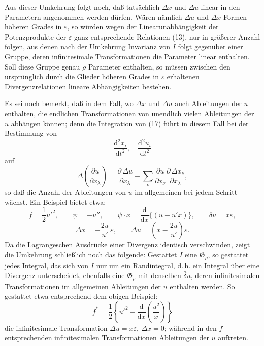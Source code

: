 \documentclass[11pt]{article}
\newcommand{\dd}{\mathrm d}
\newcommand{\G}{\mathfrak G}
\newcommand{\D}{\Delta}
\newcommand{\bd}{\bar{\delta}}
\newcommand{\eps}{\varepsilon}
\newcommand{\p}{\partial}
\begin{document}
Aus dieser Umkehrung folgt noch, daß tatsächlich \(\D x\) und \(\D u\) linear in den Parametern angenommen werden dürfen. Wären nämlich \(\D u\) und \(\D x\) Formen höheren Grades in \(\eps\), so würden wegen der Linearunabhängigkeit der Potenzprodukte der \(\eps\) ganz entsprechende Relationen (13), nur in größerer Anzahl folgen, aus denen nach der Umkehrung Invarianz von \(I\) folgt gegenüber einer Gruppe, deren infinitesimale Transformationen die Parameter linear enthalten. Soll diese Gruppe genau \(\rho\) Parameter enthalten, so müssen zwischen den ursprünglich durch die Glieder höheren Grades in \(\eps\) erhaltenen Divergenzrelationen lineare Abhängigkeiten bestehen.

Es sei noch bemerkt, daß in dem Fall, wo \(\D x\) und \(\D u\) auch Ableitungen der \(u\) enthalten, die endlichen Transformationen von unendlich vielen Ableitungen der \(u\) abhängen können; denn die Integration von (17) führt in diesem Fall bei der Bestimmung von
\[
\frac{\dd^2x_i}{\dd t^2},\quad \frac{\dd^2u_i}{\dd t^2}
\]
auf
\[
\D\!\left(\frac{\p u}{\p x_\lambda}\right)
=\frac{\p\,\D u}{\p x_\lambda}
-\sum_\nu\frac{\p u}{\p x_\nu}
\frac{\p\,\D x_\nu}{\p x_\lambda},
\]
so daß die Anzahl der Ableitungen von \(u\) im allgemeinen bei jedem Schritt wächst. Ein Beispiel bietet etwa:
\[
f=\frac12 u'^2,\qquad
\psi=-u'',\qquad
\psi\cdot x=\frac{\dd}{\dd x}\{(u-u'x)\},\qquad
\bd u=x\eps,
\]
\[
\D x=-\frac{2u}{u'}\,\eps,\qquad
\D u=\left(x-\frac{2u}{u'}\right)\eps.
\]
Da die Lagrangeschen Ausdrücke einer Divergenz identisch verschwinden, zeigt die Umkehrung schließlich noch das folgende: Gestattet \(I\) eine \(\G_\rho\), so gestattet jedes Integral, das sich von \(I\) nur um ein Randintegral, d.\,h. ein Integral über eine Divergenz unterscheidet, ebenfalls eine \(\G_\rho\) mit denselben \(\bd u\), deren infinitesimalen Transformationen im allgemeinen Ableitungen der \(u\) enthalten werden. So gestattet etwa entsprechend dem obigen Beispiel:
\[
f^*=\frac12\left\{u'^2-\frac{\dd}{\dd x}\left(\frac{u^2}{x}\right)\right\}
\]
die infinitesimale Transformation \(\D u=x\eps,\ \D x=0\); während in den \(f\) entsprechenden infinitesimalen Transformationen Ableitungen der \(u\) auftreten.
\end{document}
